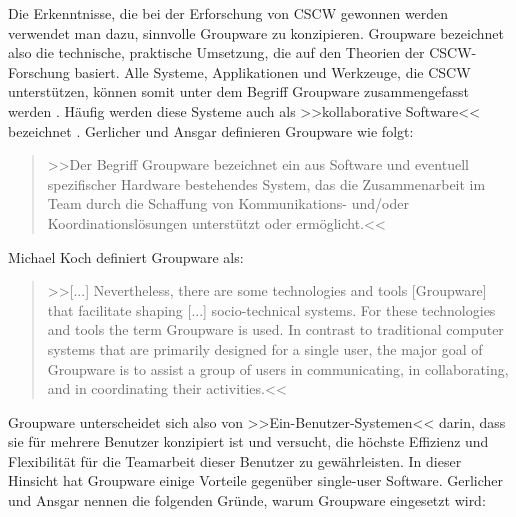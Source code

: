 	\bigskip Die Erkenntnisse, die bei der Erforschung von \ac{CSCW} gewonnen werden verwendet man dazu, sinnvolle Groupware zu konzipieren. Groupware bezeichnet also die technische, praktische Umsetzung, die auf den Theorien der \ac{CSCW}-Forschung basiert. Alle Systeme, Applikationen und Werkzeuge, die \ac{CSCW} unterstützen, können somit unter dem Begriff Groupware zusammengefasst werden \citep{Koch2008, Gerlicher:2007p241}. Häufig werden diese Systeme auch als >>kollaborative Software<< bezeichnet \citep{Bannon:1990p244}. Gerlicher und Ansgar definieren Groupware wie folgt:
	
	\medskip\begin{quote}>>Der Begriff Groupware bezeichnet ein aus Software und eventuell spezifischer Hardware bestehendes System, das die Zusammenarbeit im Team durch die Schaffung von Kommunikations- und/oder Koordinationslösungen unterstützt oder ermöglicht.<< \begin{flushright}\citep{Gerlicher:2007p241}\end{flushright}\end{quote}
	
	\medskip Michael Koch definiert Groupware als:
	
	\medskip\begin{quote}>>[...] Nevertheless, there are some technologies and tools [Groupware] that facilitate shaping [...] socio-technical systems. For these technologies and tools the term Groupware is used. In contrast to traditional computer systems that are primarily designed for a single user, the major goal of Groupware is to assist a group of users in communicating, in collaborating, and in coordinating their activities.<< \begin{flushright}\citep{Koch2008}\end{flushright}\end{quote}
	
	\medskip Groupware unterscheidet sich also von >>Ein-Benutzer-Systemen<< darin, dass sie für mehrere Benutzer konzipiert ist und versucht, die höchste Effizienz und Flexibilität für die Teamarbeit dieser Benutzer zu gewährleisten. In dieser Hinsicht hat Groupware einige Vorteile gegenüber single-user Software. Gerlicher und Ansgar nennen die folgenden Gründe, warum Groupware eingesetzt wird: 
	
